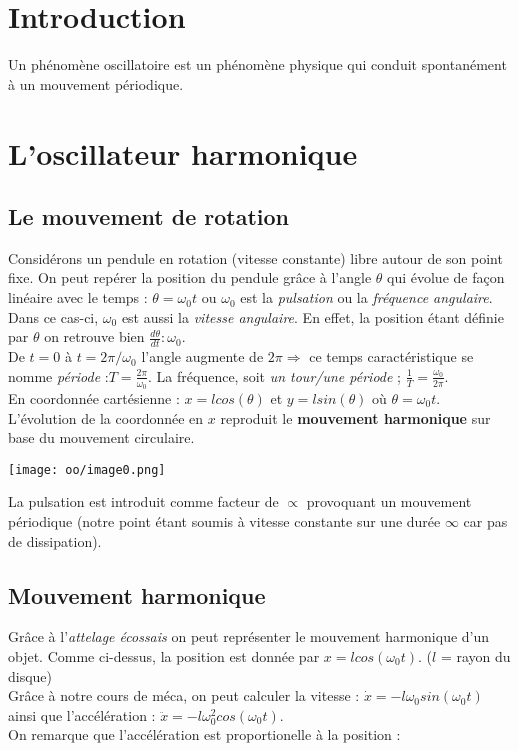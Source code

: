 \documentclass[british,french,11pt, a4paper, openany]{book}
\begin{document}
	\section{Introduction}
	Un phénomène oscillatoire est un phénomène physique qui conduit spontanément à un mouvement périodique.
	
	\section{L'oscillateur harmonique} 
	\subsection{Le mouvement de rotation}
	Considérons un pendule en rotation (vitesse constante) libre autour de son point fixe. 
	On peut repérer la position du pendule grâce à l'angle $\theta$ qui évolue de façon linéaire avec le temps : $\theta = \omega_0 t$ ou $\omega_0$ est la \textit{pulsation} ou la \textit{fréquence angulaire}.\\
	Dans ce cas-ci, $\omega_0$ est aussi la \textit{vitesse angulaire}. En effet, la position étant définie par $\theta$ on retrouve bien $\frac{d\theta}{dt} : \omega_0$.\\
	
	De $t = 0$ à $t = 2\pi/\omega_0$ l'angle augmente de $2\pi \Rightarrow$ ce temps caractéristique se nomme \textit{période} :$T = \frac{2\pi}{\omega_0}$. La fréquence, soit \textit{un tour/une période} ; $\frac{1}{T} = \frac{\omega_0}{2\pi}$.\\
	
	En coordonnée cartésienne : $x = l cos(\theta)$ et $y = l sin(\theta)$ où $\theta = \omega_0 t$. L'évolution de la coordonnée en $x$ reproduit le \textbf{mouvement harmonique} sur base du mouvement circulaire.
	
	\begin{center}
		\texttt{[image: oo/image0.png]}
	\end{center}
	La pulsation est introduit comme facteur de $\propto$ provoquant un mouvement périodique (notre point étant soumis à vitesse constante sur une durée $\infty$ car pas de dissipation).
	\subsection{Mouvement harmonique}
	Grâce à l'\textit{attelage écossais} on peut représenter le mouvement harmonique d'un objet. Comme ci-dessus, la position est donnée par $x = l cos(\omega_0 t)$. ($l$ = rayon du disque)\\
	Grâce à notre cours de méca, on peut calculer la vitesse : $\dot{x} = -l \omega_0 sin(\omega_0 t)$ ainsi que l'accélération : $\ddot{x} = -l \omega_0^2 cos(\omega_0 t)$. \\
	On remarque que l'accélération est proportionelle à la position : 
	
\end{document}

